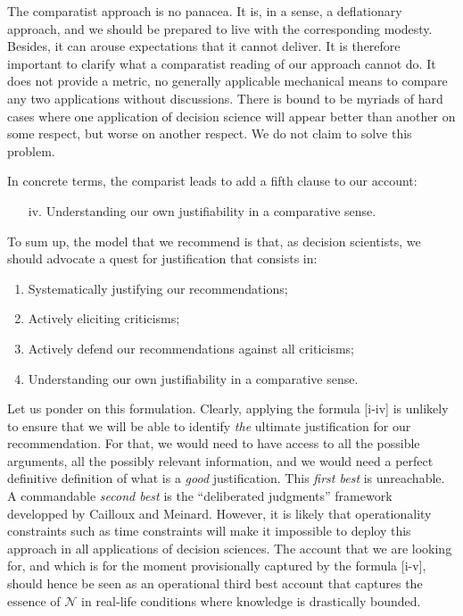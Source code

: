 \documentclass[preprint, french, english, 11pt, authoryear]{elsarticle}%
\newcommand{\adv}{\mathscr{N}}
\begin{document}
The comparatist approach is no panacea. It is, in a sense, a deflationary approach, and we should be prepared to live with the corresponding modesty. 
Besides, it can arouse expectations that it cannot deliver. It is therefore important to clarify what a comparatist reading of our approach cannot do. It does not provide a metric, no generally applicable mechanical means to compare any two applications without discussions. There is bound to be myriads of hard cases where one application of decision science will appear better than another on some respect, but worse on another respect. We do not claim to solve this problem.

In concrete terms, the comparist leads to add a fifth clause to our account:
\begin{itemize}
\item[iv.]	Understanding our own justifiability in a comparative sense.
\end{itemize}

To sum up, the model that we recommend is that, as decision scientists, we should advocate a quest for justification that consists in:
\begin{enumerate}[label=\roman*.]
	\item Systematically justifying our recommendations;
	\item Actively eliciting criticisms;
	\item Actively defend our recommendations against all criticisms;
	\item Understanding our own justifiability in a comparative sense.
\end{enumerate}

Let us ponder on this formulation. Clearly, applying the formula [i-iv] is unlikely to ensure that we will be able to identify \emph{the} ultimate justification for our recommendation. For that, we would need to have access to all the possible arguments, all the possibly relevant information, and we would need a perfect definitive definition of what is a \emph{good} justification. This \emph{first best} is unreachable. A commandable \emph{second best} is the ``deliberated judgments'' framework developped by Cailloux and Meinard. However, it is likely that operationality constraints such as time constraints will make it impossible to deploy this approach in all applications of decision sciences. The account that we are looking for, and which is for the moment provisionally captured by the formula [i-v], should hence be seen as an operational third best account that captures the essence of $\adv$ in real-life conditions where knowledge is drastically bounded.
\end{document}
